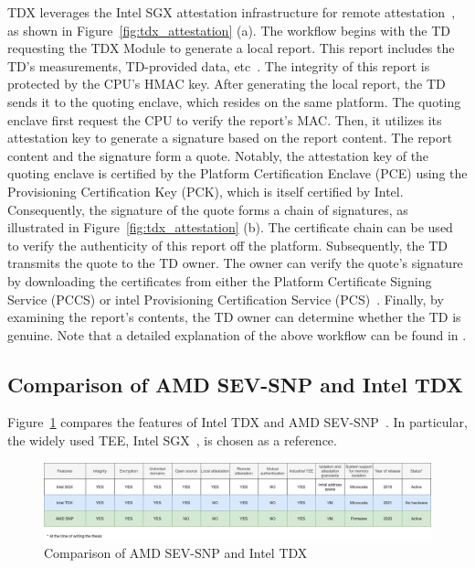 TDX leverages the Intel SGX attestation infrastructure for remote attestation~\cite*{Intel_tdx_whitepaper}, as shown in Figure~\ref{fig:tdx_attestation} (a).
The workflow begins with the TD requesting the TDX Module to generate a local report. This report includes the TD's measurements, TD-provided data, etc~\cite*{Intel_tdx_whitepaper}. The integrity of this report is protected by the CPU's HMAC key.
After generating the local report, the TD sends it to the quoting enclave,  which resides on the same platform. The quoting enclave first request the CPU to verify the report's MAC. Then, it utilizes its attestation key to generate a signature based on the 
report content. The report content and the signature form a quote. Notably, the attestation key of the quoting enclave is certified by the Platform Certification Enclave (PCE) using the Provisioning Certification Key (PCK), which is itself certified by Intel.
Consequently, the signature of the quote forms a chain of signatures, as illustrated in Figure~\ref{fig:tdx_attestation} (b). The certificate chain can be used to verify the authenticity of this report off the platform. Subsequently, the TD transmits the quote to the TD owner. 
The owner can verify the quote's signature by downloading the certificates from  
either the Platform Certificate Signing Service (PCCS) or intel Provisioning Certification Service (PCS)~\cite*{DBLP:journals/corr/abs-2303-15540}.
Finally, by examining the report's contents, the TD owner can determine whether the TD is genuine.  Note that a detailed explanation of the above workflow can be found in \cite*{DBLP:journals/corr/abs-2303-15540}. 

\subsection{Comparison of AMD SEV-SNP and Intel TDX}
Figure~\ref{fig:snp_tdx_compare} compares the features of Intel TDX and AMD SEV-SNP~\cite*{amd_sev_summarize}. In particular, the widely used \acrshort{TEE}, Intel SGX~\cite*{INTEL_SGX}, is chosen 
as a reference.

\begin{figure}[htp]
  \centering
  \includegraphics[width=1\textwidth]{images/snp_tdx_compare.png}
  \caption[Comparison of AMD SEV-SNP and Intel TDX]{Comparison of AMD SEV-SNP and Intel TDX~\cite*{amd_sev_summarize}}
  \label{fig:snp_tdx_compare}
\end{figure}




